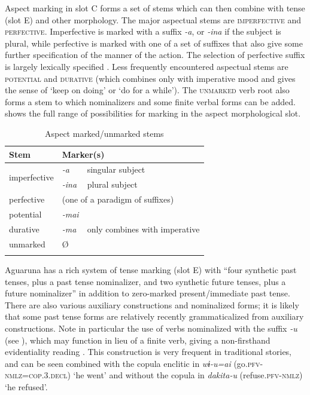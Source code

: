 \documentclass[output=paper,colorlinks,citecolor=brown,draft]{langscibook}
\begin{document}
Aspect marking in slot C forms a set of stems which can then combine with tense (slot E) and other morphology. The major aspectual stems are \textsc{imperfective} and \textsc{perfective}. Imperfective is marked with a suffix \textit{{}-a}, or \textit{{}-ina} if the subject is plural, while perfective is marked with one of a set of suffixes that also give some further specification of the manner of the action. The selection of perfective suffix is largely lexically specified \citep[328]{Overall2017a}. Less frequently encountered aspectual stems are \textsc{potential} and \textsc{durative} (which combines only with imperative mood and gives the sense of ‘keep on doing’ or ‘do for a while’). The \textsc{unmarked} verb root also forms a stem to which nominalizers and some finite verbal forms can be added.  shows the full range of possibilities for marking in the aspect morphological slot.

\begin{table}
\begin{tabular}{lll}
\lsptoprule
{Stem}                          & \multicolumn{2}{l}{Marker(s)}\\
\midrule 
\multirow{2}{*}{imperfective} & \textit{{}-a}  & singular subject \\
                                & \textit{{}-ina}       & plural subject\\
{perfective}           & \multicolumn{2}{l}{(one of a paradigm of suffixes)}\\
{potential}            & \textit{-mai}     & \\
{durative}             & \textit{{}-ma}       & only combines with imperative \\
{unmarked}             & \multicolumn{2}{l}{Ø}\\
\lspbottomrule
\end{tabular}
\caption{Aspect marked/unmarked stems}
\label{tab:agu:1}
\end{table}

Aguaruna has a rich system of tense marking (slot E) with “four synthetic past tenses, plus a past tense nominalizer, and two synthetic future tenses, plus a future nominalizer” \citep[16]{Overall2017a} in addition to zero-marked present/immediate past tense. There are also various auxiliary constructions and nominalized forms; it is likely that some past tense forms are relatively recently grammaticalized from auxiliary constructions. Note in particular the use of verbs nominalized with the suffix \textit{{}-u} (see ), which may function in lieu of a finite verb, giving a non-firsthand evidentiality reading \citep{Overall2014}. This construction is very frequent in traditional stories, and can be seen combined with the copula enclitic in  \textit{wɨ\nobreakdash-u=ai} (go.\textsc{pfv-nmlz=cop.3.decl}) ‘he went’ and without the copula in  \textit{dakita-u} (refuse.\textsc{pfv-nmlz}) ‘he refused’.
\end{document}
